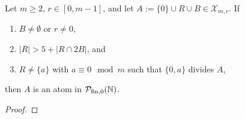 \begin{prop}
Let $m\ge 2$, $r\in [0,m-1]$, and let $A := \{0\}\cup R \cup B \in \mathcal{X}_{m,r}$.
If 
\begin{enumerate}[label={\rm (\arabic{*})}]
	\item $B\neq \emptyset$ or $r\neq 0$,
	\item $|R| > 5 + |R\cap 2B|$, and
	\item $R \neq \{a\}$ with $a\equiv 0 \mod m$ such that $\{0,a\}$ divides $A$,
\end{enumerate}
then $A$ is an atom in ${\mathcal{P}_{\textrm{fin},0}(\mathbb{N})}$.
\end{prop}

\begin{proof}

\end{proof}
